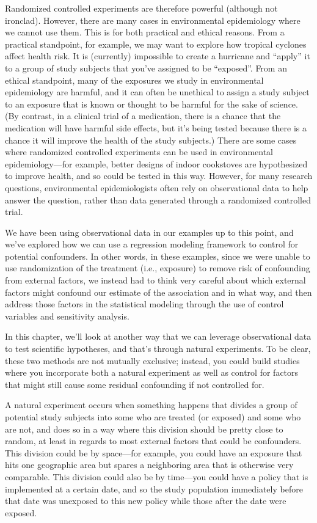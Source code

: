 \documentclass[
]{book}
\begin{document}
Randomized controlled experiments are therefore powerful (although not ironclad). However, there are many cases in environmental epidemiology where we cannot use them. This is for both practical and ethical reasons. From a practical standpoint, for example, we may want to explore how tropical cyclones affect health risk. It is (currently) impossible to create a hurricane and ``apply'' it to a group of study subjects that you've assigned to be ``exposed''. From an ethical standpoint, many of the exposures we study in environmental epidemiology are harmful, and it can often be unethical to assign a study subject to an exposure that is known or thought to be harmful for the sake of science. (By contrast, in a clinical trial of a medication, there is a chance that the medication will have harmful side effects, but it's being tested because there is a chance it will improve the health of the study subjects.) There are some cases where randomized controlled experiments can be used in environmental epidemiology---for example, better designs of indoor cookstoves are hypothesized to improve health, and so could be tested in this way. However, for many research questions, environmental epidemiologists often rely on observational data to help answer the question, rather than data generated through a randomized controlled trial.

We have been using observational data in our examples up to this point, and we've explored how we can use a regression modeling framework to control for potential confounders. In other words, in these examples, since we were unable to use randomization of the treatment (i.e., exposure) to remove risk of confounding from external factors, we instead had to think very careful about which external factors might confound our estimate of the association and in what way, and then address those factors in the statistical modeling through the use of control variables and sensitivity analysis.

In this chapter, we'll look at another way that we can leverage observational data to test scientific hypotheses, and that's through natural experiments. To be clear, these two methods are not mutually exclusive; instead, you could build studies where you incorporate both a natural experiment as well as control for factors that might still cause some residual confounding if not controlled for.

A natural experiment occurs when something happens that divides a group of potential study subjects into some who are treated (or exposed) and some who are not, and does so in a way where this division should be pretty close to random, at least in regards to most external factors that could be confounders. This division could be by space---for example, you could have an exposure that hits one geographic area but spares a neighboring area that is otherwise very comparable. This division could also be by time---you could have a policy that is implemented at a certain date, and so the study population immediately before that date was unexposed to this new policy while those after the date were exposed.
\end{document}
